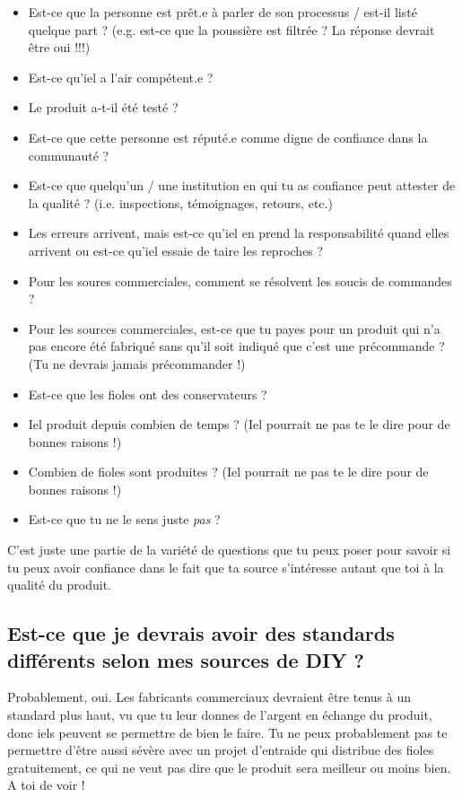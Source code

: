 \documentclass{article}
\begin{document}
\begin{itemize}
  \item Est-ce que la personne est prêt.e à parler de son processus / est-il listé quelque part ? (e.g. est-ce que la poussière est filtrée ? La réponse devrait être oui !!!)
  \item Est-ce qu'iel a l'air compétent.e ?
  \item Le produit a-t-il été testé ? 
  \item Est-ce que cette personne est réputé.e comme digne de confiance dans la communauté ?
  \item Est-ce que quelqu'un / une institution en qui tu as confiance peut attester de la qualité ? (i.e. inspections, témoignages, retours, etc.)
  \item Les erreurs arrivent, mais est-ce qu'iel en prend la responsabilité quand elles arrivent ou est-ce qu'iel essaie de taire les reproches ? 
  \item Pour les soures commerciales, comment se résolvent les soucis de commandes ?
  \item Pour les sources commerciales, est-ce que tu payes pour un produit qui n'a pas encore été fabriqué sans qu'il soit indiqué que c'est une précommande ? (Tu ne devrais jamais précommander !)
  \item Est-ce que les fioles ont des conservateurs ?
  \item Iel produit depuis combien de temps ? (Iel pourrait ne pas te le dire pour de bonnes raisons !)
  \item Combien de fioles sont produites ? (Iel pourrait ne pas te le dire pour de bonnes raisons !)
  \item Est-ce que tu ne le sens juste \textit{pas} ?
\end{itemize}

C'est juste une partie de la variété de questions que tu peux poser pour savoir si tu peux avoir confiance dans le fait que ta source s'intéresse autant que toi à la qualité du produit.

\subsection{Est-ce que je devrais avoir des standards différents selon mes sources de DIY ?}

Probablement, oui. Les fabricants commerciaux devraient être tenus à un standard plus haut, vu que tu leur donnes de l'argent en échange du produit, donc iels peuvent se permettre de bien le faire. Tu ne peux probablement pas te permettre d'être aussi sévère avec un projet d'entraide qui distribue des fioles gratuitement, ce qui ne veut pas dire que le produit sera meilleur ou moins bien. A toi de voir ! 
\end{document}
